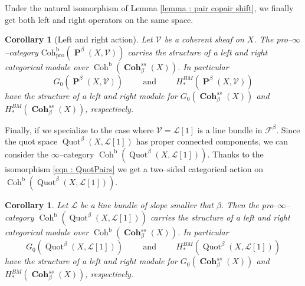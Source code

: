 \documentclass[11pt]{article}
\newtheorem{corollary}[theorem]{Corollary}
\newcommand{\pro}{\operatorname{Coh^b_{pro}}}
\newcommand{\fbeta}{\mathcal{F}^{\beta}}
\newcommand{\coh}{\operatorname{Coh}}
\newcommand{\cohbetassstack}{\boldsymbol{\operatorname{Coh}}^{ss}_{\beta}(X)}
\newcommand{\framing}{\mathcal{V}}
\newcommand{\linebundle}{\mathcal{L}}
\newcommand{\pairs}{\boldsymbol{\operatorname{P}}^{\beta}(X,\mathcal{V})}
\newcommand{\Quotbetaone}{\operatorname{Quot}^{\beta}(X,\mathcal{L}[1])}
\begin{document}
   \noindent Under the natural isomorphism of Lemma \ref{lemma : pair copair shift}, we finally get both left and right operators on the same space. 

   \begin{corollary}[Left and right action]
       Let $\framing$ be a coherent sheaf on $X$. The pro--$\infty$--category $\pro(\pairs)$ carries the structure of a left and right categorical module over $\coh^{\operatorname{b}}(\cohbetassstack)$. In particular 
      \[
            G_0(\pairs) \hspace{1cm} \text{and} \hspace{1cm} H_*^{BM}(\pairs)
       \]
       have the structure of a left and right module for $G_0(\cohbetassstack)$ and $H_*^{BM}(\cohbetassstack)$, respectively.
   \end{corollary}

   \noindent Finally, if we specialize to the case where $\framing = \linebundle[1]$ is a line bundle in $\fbeta$. Since the quot space $\Quotbetaone$ has proper connected components, we can consider the $\infty$--category $\coh^{\operatorname{b}}(\Quotbetaone)$. Thanks to the isomorphism \eqref{eqn : QuotPairs} we get a two--sided categorical action on $\coh^{\operatorname{b}}(\Quotbetaone)$. 

   \begin{corollary}
       Let $\linebundle$ be a line bundle of slope smaller that $\beta$. Then the pro--$\infty$--category \newline
       \noindent$\coh^{\operatorname{b}}(\Quotbetaone)$ carries the structure of a left and right categorical module over $\coh^{\operatorname{b}}(\cohbetassstack)$. In particular 
      \[
            G_0(\Quotbetaone) \hspace{1cm} \text{and} \hspace{1cm} H_*^{BM}(\Quotbetaone)
       \]
       have the structure of a left and right module for $G_0(\cohbetassstack)$ and $H_*^{BM}(\cohbetassstack)$, respectively.
   \end{corollary}

   




\newpage



\end{document}
